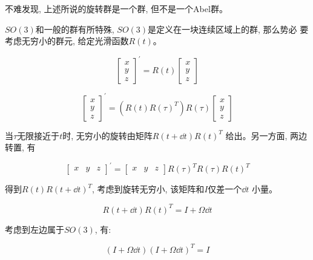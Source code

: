 \documentclass{ctexart}
\numberwithin{equation}{subsection}
\numberwithin{theorem}{subsection}
\numberwithin{definition}{subsection}
\numberwithin{proof}{subsection}
\numberwithin{lemma}{subsection}
\numberwithin{example}{subsection}
\numberwithin{remark}{subsection}
\numberwithin{corollary}{subsection}
\numberwithin{exercise}{subsection}
\numberwithin{problem}{subsection}
\numberwithin{question}{section}
\numberwithin{method}{subsection}
\begin{document}
    不难发现, 上述所说的旋转群是一个群, 但不是一个Abel群。

    $SO(3)$和一般的群有所特殊, $SO(3)$是定义在一块连续区域上的群, 那么势必
    要考虑无穷小的群元, 给定光滑函数$R(t)$。

    \begin{equation}
        \begin{bmatrix}
            x \\ y \\ z
        \end{bmatrix}^\prime = R(t) \begin{bmatrix}
            x \\ y \\ z
        \end{bmatrix}
    \end{equation}

    \begin{equation}
        \begin{bmatrix}
            x \\ y \\ z
        \end{bmatrix}^\prime = (R(t)R(\tau)^T) R(\tau) \begin{bmatrix}
            x \\ y \\ z
        \end{bmatrix}
    \end{equation}

    当$\tau$无限接近于$t$时, 无穷小的旋转由矩阵$R(t + \dd t)R(t)^T$
    给出。另一方面, 两边转置, 有

    \begin{equation}
        \begin{bmatrix}
            x & y & z
        \end{bmatrix}^\prime = \begin{bmatrix}
            x & y & z
        \end{bmatrix} R(\tau)^T R(\tau) R(t)^T
    \end{equation}

    得到$R(t) R(t + \dd t)^T$, 考虑到旋转无穷小, 该矩阵和$I$仅差一个$\dd t$
    小量。

    \begin{equation}
        R(t + \dd t)R(t)^T = I + \Omega \dd t 
    \end{equation}

    考虑到左边属于$SO(3)$, 有:

    \begin{equation}
        (I + \Omega \dd t)(I + \Omega \dd t)^T = I
    \end{equation}
\end{document}
